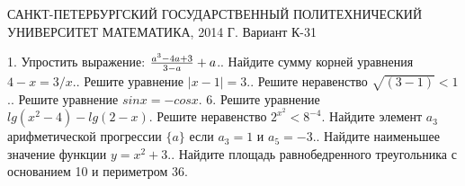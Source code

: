 \documentclass[12pt,a4paper,oneside]{article}
\begin{document}
\begin{center}
САНКТ-ПЕТЕРБУРГСКИЙ ГОСУДАРСТВЕННЫЙ\newline
ПОЛИТЕХНИЧЕСКИЙ УНИВЕРСИТЕТ\newline
МАТЕМАТИКА, 2014 Г.\newline
Вариант К-31\newline
\end{center} 
1. Упростить выражение: \({a^3-4a+3\over3-a} + a\).. Найдите сумму корней уравнения \(4-x=3/x\).. Решите уравнение \(|x-1|=3\).. Решите неравенство \(\sqrt{(3-1)}<1 \).. Решите уравнение \(sinx = -cosx\).
6. Решите уравнение \(lg(x^2-4)-lg(2-x) \). Решите неравенство \(2^{x^2} < 8^{-4}\). Найдите элемент \(a_3\) арифметической прогрессии \(\{a\}\) если \(a_3=1\) и \(a_5=-3\).. Найдите наименьшее значение функции \( y = x^2 +3 \).. Найдите площадь равнобедренного треугольника с основанием 10 и периметром 36.\newline
\end{document}
